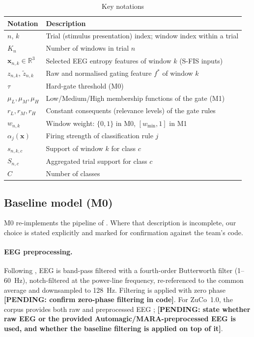 \documentclass[11pt,a4paper]{article}
\newcommand{\pending}[1]{\textcolor{red!75!black}{\textbf{[PENDING: #1]}}}
\newcommand{\dataset}{ZuCo~1.0}
\begin{document}
\begin{table}[t]
\centering\small
\caption{Key notations}\label{tab:notation}
\begin{tabular}{@{}ll@{}}
\toprule
Notation & Description\\
\midrule
$n$, $k$ & Trial (stimulus presentation) index; window index within a trial\\
$K_n$ & Number of windows in trial $n$\\
$\mathbf{x}_{n,k}\in\mathbb{R}^{3}$ & Selected EEG entropy features of window $k$ (S-FIS inputs)\\
$z_{n,k}$, $\tilde z_{n,k}$ & Raw and normalised gating feature $f^\ast$ of window $k$\\
$\tau$ & Hard-gate threshold (M0)\\
$\mu_{L},\mu_{M},\mu_{H}$ & Low/Medium/High membership functions of the gate (M1)\\
$r_{L},r_{M},r_{H}$ & Constant consequents (relevance levels) of the gate rules\\
$w_{n,k}$ & Window weight: $\{0,1\}$ in M0, $[w_{\min},1]$ in M1\\
$\alpha_j(\mathbf{x})$ & Firing strength of classification rule $j$\\
$s_{n,k,c}$ & Support of window $k$ for class $c$\\
$S_{n,c}$ & Aggregated trial support for class $c$\\
$C$ & Number of classes\\
\bottomrule
\end{tabular}
\end{table}

\subsection{Baseline model (M0)}
M0 re-implements the pipeline of \cite{FarhadiSedehi2024a}. Where that description is incomplete, our choice is stated explicitly and marked for confirmation against the team's code.

\paragraph{EEG preprocessing.}
Following \cite{FarhadiSedehi2024a}, EEG is band-pass filtered with a fourth-order Butterworth filter (1--60~Hz), notch-filtered at the power-line frequency, re-referenced to the common average and downsampled to 128~Hz. Filtering is applied with zero phase \pending{confirm zero-phase filtering in code}. For \dataset{}, the corpus provides both raw and preprocessed EEG \cite{Hollenstein2018}; \pending{state whether raw EEG or the provided Automagic/MARA-preprocessed EEG \cite{Pedroni2019,Winkler2011} is used, and whether the baseline filtering is applied on top of it}.
\end{document}
